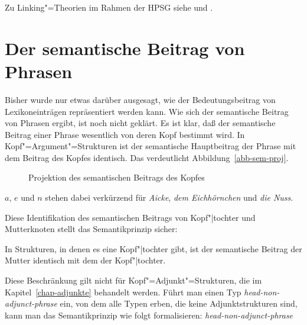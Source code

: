Zu Linking"=Theorien im Rahmen der HPSG siehe  und .

\section{Der semantische Beitrag von Phrasen}
\label{sec-semp-i}

Bisher wurde nur etwas darüber ausgesagt, wie der Bedeutungsbeitrag von Lexikoneinträgen repräsentiert
werden kann. Wie sich der semantische Beitrag von Phrasen ergibt, ist noch nicht geklärt.
Es ist klar, daß der semantische Beitrag einer Phrase wesentlich von deren Kopf bestimmt
wird. In Kopf"=Argument"=Strukturen ist der semantische Hauptbeitrag der Phrase mit dem
Beitrag des Kopfes identisch. Das verdeutlicht Abbildung~\vref{abb-sem-proj}.
\begin{figure}
\centering%
\caption{\label{abb-sem-proj}Projektion des semantischen Beitrags des Kopfes}
\end{figure}
$a$, $e$ und $n$ stehen dabei verkürzend für \emph{Aicke}, \emph{dem Eichhörnchen} und \emph{die Nuss}.

Diese Identifikation des semantischen Beitrags von Kopf"|tochter und Mutterknoten
stellt das Semantikprinzip sicher:
%
\begin{prinzip-break}
\label{semp-i}
In Strukturen, in denen es eine Kopf"|tochter gibt, ist der
semantische Beitrag der Mutter identisch mit dem der Kopf"|tochter.
\end{prinzip-break}
Diese Beschränkung gilt nicht für Kopf"=Adjunkt"=Strukturen, 
die im Kapitel~\ref{chap-adjunkte} behandelt werden.
Führt man einen Typ \textit{head-non-adjunct-phrase} ein, von dem alle Typen
erben, die keine Adjunktstrukturen sind, kann man das Semantikprinzip wie folgt formalisieren:
\ea
\textit{head-non-adjunct-phrase} \impl
{}
\z

